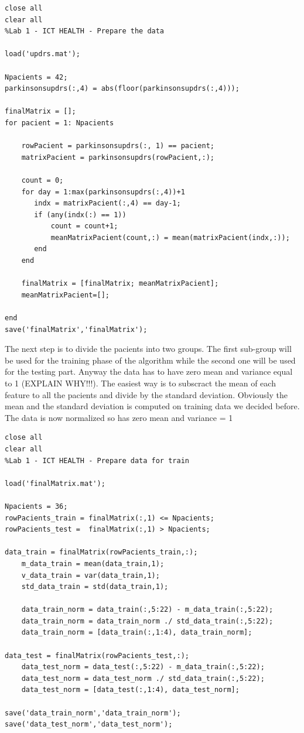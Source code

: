 \documentclass[12pt]{article}
\begin{document}
\begingroup
    \fontsize{12pt}{8pt}\selectfont
\begin{verbatim}
close all
clear all
%Lab 1 - ICT HEALTH - Prepare the data

load('updrs.mat');

Npacients = 42;
parkinsonsupdrs(:,4) = abs(floor(parkinsonsupdrs(:,4)));

finalMatrix = [];
for pacient = 1: Npacients

    rowPacient = parkinsonsupdrs(:, 1) == pacient;
    matrixPacient = parkinsonsupdrs(rowPacient,:);

    count = 0;
    for day = 1:max(parkinsonsupdrs(:,4))+1
       indx = matrixPacient(:,4) == day-1;
       if (any(indx(:) == 1))
           count = count+1;
           meanMatrixPacient(count,:) = mean(matrixPacient(indx,:));
       end
    end

    finalMatrix = [finalMatrix; meanMatrixPacient];
    meanMatrixPacient=[];

end
save('finalMatrix','finalMatrix');
\end{verbatim}
\endgroup
The next step is to divide the pacients into two groups. The first sub-group will be used for the training phase of the algorithm while the second one will be used for the testing part. Anyway the data has to have zero mean and variance equal to 1 (EXPLAIN WHY!!!). The easiest way is to subscract the mean of each feature  
to all the pacients and divide by the standard deviation. Obviously the mean and the standard deviation is computed on training data we decided before. The data is now normalized so has zero mean and variance = 1

\begingroup
	\fontsize{12pt}{8pt}\selectfont

    \begin{verbatim}
close all
clear all
%Lab 1 - ICT HEALTH - Prepare data for train

load('finalMatrix.mat');

Npacients = 36;
rowPacients_train = finalMatrix(:,1) <= Npacients;
rowPacients_test =  finalMatrix(:,1) > Npacients;

data_train = finalMatrix(rowPacients_train,:);
    m_data_train = mean(data_train,1);
    v_data_train = var(data_train,1);
    std_data_train = std(data_train,1);

    data_train_norm = data_train(:,5:22) - m_data_train(:,5:22);
    data_train_norm = data_train_norm ./ std_data_train(:,5:22);
    data_train_norm = [data_train(:,1:4), data_train_norm];

data_test = finalMatrix(rowPacients_test,:);
    data_test_norm = data_test(:,5:22) - m_data_train(:,5:22);
    data_test_norm = data_test_norm ./ std_data_train(:,5:22);
    data_test_norm = [data_test(:,1:4), data_test_norm];

save('data_train_norm','data_train_norm');
save('data_test_norm','data_test_norm');
\end{verbatim}
\end{document}
